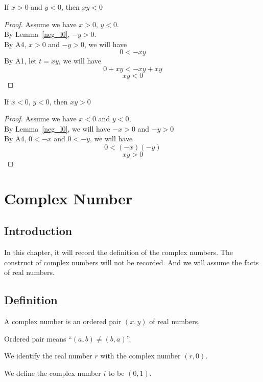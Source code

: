 \documentclass[a4paper]{article}
\begin{document}
\begin{nlemma}\label{PosNegHaveNeg}
If $x > 0$ and $y < 0$, then $xy < 0$
\end{nlemma}
\begin{proof}
Assume we have $x > 0$, $y < 0$.\\
By Lemma~\ref{neg_l0}, $-y > 0$.\\
By A4, $x > 0$ and $-y > 0$, we will have $$0 < -xy$$
By A1, let $t = xy$, we will have $$0 + xy < -xy + xy$$
$$xy < 0$$
\end{proof}

\begin{nlemma}\label{NegNegHavePos}
If $x < 0$, $y < 0$, then $xy > 0$
\end{nlemma}
\begin{proof}
Assume we have $x < 0$ and $y < 0$,\\
By Lemma~\ref{neg_l0}, we will have $-x > 0$ and $-y > 0$\\
By A4, $0 < -x$ and $0 < -y$, we will have $$0 < (-x)(-y)$$
$$xy > 0$$
\end{proof}

\section{Complex Number}
\subsection{Introduction}
In this chapter, it will record the definition of the complex numbers. The construct of complex numbers will not be recorded. And we will assume the facts of real numbers.

\subsection{Definition}
\begin{ndefi}
A complex number is an ordered pair $(x,y)$ of real numbers.
\end{ndefi}
Ordered pair means ``$(a,b) \neq (b,a)$''.

\begin{ndefi}
We identify the real number $r$ with the complex number $(r , 0)$.
\end{ndefi}

\begin{ndefi}[$i$]
We define the complex number $i$ to be $(0, 1)$.
\end{ndefi}
\end{document}
